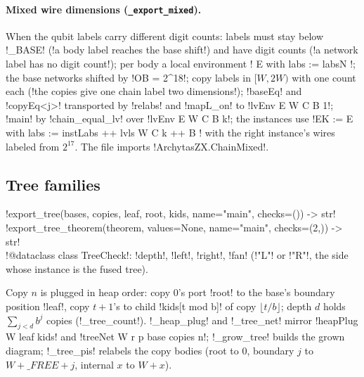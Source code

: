 {{{\paragraph{Mixed wire dimensions (\texttt{\_export\_mixed}).} When the qubit labels carry
different digit counts: labels must stay below \lexpy!_BASE! (\lexcode!a body label reaches the base shift!) and have digit counts (\lexcode!a network label has no digit count!); per body a local
environment \lexlean!{ E with labs := labsN }!; the base networks shifted by \lexlean!OB = 2^18!; copy
labels in $[W, 2W)$ with one count each (\lexcode!the copies give one chain label two dimensions!);
\lexlean!baseEq! and \lexlean!copyEq<j>! transported by \lexlean!relabs! and \lexlean!mapL_on! to
\lexlean!lvEnv E W C B 1!; \lexlean!main! by \lexlean!chain_equal_lv! over \lexlean!lvEnv E W C B k!; the
instances use \lexlean!EK := { E with labs := instLabs ++ lvls W C k ++ B }! with the right
instance's wires labeled from $2^{17}$. The file imports \lexlean!ArchytasZX.ChainMixed!.

\subsection{Tree families}

\begin{signature}
\lexpy!export_tree(bases, copies, leaf, root, kids, name="main", checks=()) -> str!\\
\lexpy!export_tree_theorem(theorem, values=None, name="main", checks=(2,)) -> str!\\
\lexpy!@dataclass class TreeCheck!: \lexpy!depth!, \lexpy!left!, \lexpy!right!, \lexpy!fan! (\lexcode!"L"! or
\lexcode!"R"!, the side whose instance is the fused tree).
\end{signature}
Copy $n$ is plugged in heap order: copy 0's port \lexcode!root! to the base's boundary position
\lexcode!leaf!, copy $t+1$'s to child \lexcode!kids[t mod b]! of copy $\lfloor t/b\rfloor$; depth $d$
holds $\sum_{j<d} b^{j}$ copies (\lexpy!_tree_count!). \lexpy!_heap_plug! and \lexpy!_tree_net! mirror
\lexlean!heapPlug W leaf kids! and \lexlean!treeNet W r p base copies n!; \lexpy!_grow_tree! builds the
grown diagram; \lexpy!_tree_pis! relabels the copy bodies (root to 0, boundary $j$ to $W+\_FREE+j$,
internal $x$ to $W+x$).

}}}
